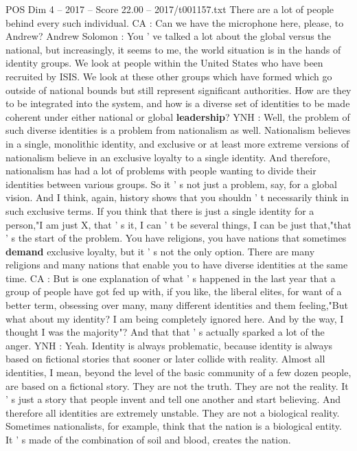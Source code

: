 \begin{textsample}{POS Dim 4 – 2017 – Score 22.00 – 2017/t001157.txt}
There are a lot of people behind every such individual.
CA : Can we have the microphone here, please, to Andrew?
Andrew Solomon : You ' ve talked a lot about the global versus the national, but increasingly, it seems to me, the world situation is in the hands of identity groups.
We look at people within the United States who have been recruited by ISIS.
We look at these other groups which have formed which go outside of national bounds but still represent significant authorities.
How are they to be integrated into the system, and how is a diverse set of identities to be made coherent under either national or global \textbf{leadership}?
YNH : Well, the problem of such diverse identities is a problem from nationalism as well.
Nationalism believes in a single, monolithic identity, and exclusive or at least more extreme versions of nationalism believe in an exclusive loyalty to a single identity.
And therefore, nationalism has had a lot of problems with people wanting to divide their identities between various groups.
So it ' s not just a problem, say, for a global vision.
And I think, again, history shows that you shouldn ' t necessarily think in such exclusive terms.
If you think that there is just a single identity for a person,"I am just X, that ' s it, I can ' t be several things, I can be just that,"that ' s the start of the problem.
You have religions, you have nations that sometimes \textbf{demand} exclusive loyalty, but it ' s not the only option.
There are many religions and many nations that enable you to have diverse identities at the same time.
CA : But is one explanation of what ' s happened in the last year that a group of people have got fed up with, if you like, the liberal elites, for want of a better term, obsessing over many, many different identities and them feeling,"But what about my identity?
I am being completely ignored here.
And by the way, I thought I was the majority"?
And that that ' s actually sparked a lot of the anger.
YNH : Yeah.
Identity is always problematic, because identity is always based on fictional stories that sooner or later collide with reality.
Almost all identities, I mean, beyond the level of the basic community of a few dozen people, are based on a fictional story.
They are not the truth.
They are not the reality.
It ' s just a story that people invent and tell one another and start believing.
And therefore all identities are extremely unstable.
They are not a biological reality.
Sometimes nationalists, for example, think that the nation is a biological entity.
It ' s made of the combination of soil and blood, creates the nation.

\end{textsample}

